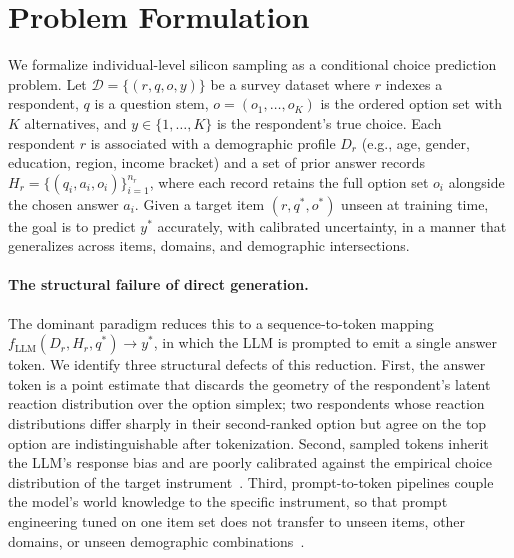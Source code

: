 \section{Problem Formulation}
\label{sec:problem}

We formalize individual-level silicon sampling as a conditional choice prediction problem. Let $\mathcal{D}=\{(r,q,o,y)\}$ be a survey dataset where $r$ indexes a respondent, $q$ is a question stem, $o=(o_1,\dots,o_K)$ is the ordered option set with $K$ alternatives, and $y\in\{1,\dots,K\}$ is the respondent's true choice. Each respondent $r$ is associated with a demographic profile $D_r$ (e.g., age, gender, education, region, income bracket) and a set of prior answer records $H_r=\{(q_i,a_i,o_i)\}_{i=1}^{n_r}$, where each record retains the full option set $o_i$ alongside the chosen answer $a_i$. Given a target item $(r,q^\ast,o^\ast)$ unseen at training time, the goal is to predict $y^\ast$ accurately, with calibrated uncertainty, in a manner that generalizes across items, domains, and demographic intersections.

\paragraph{The structural failure of direct generation.} The dominant paradigm reduces this to a sequence-to-token mapping $f_{\text{LLM}}(D_r,H_r,q^\ast)\to y^\ast$, in which the LLM is prompted to emit a single answer token. We identify three structural defects of this reduction. First, the answer token is a point estimate that discards the geometry of the respondent's latent reaction distribution over the option simplex; two respondents whose reaction distributions differ sharply in their second-ranked option but agree on the top option are indistinguishable after tokenization. Second, sampled tokens inherit the LLM's response bias and are poorly calibrated against the empirical choice distribution of the target instrument~\citep{geng2024survey}. Third, prompt-to-token pipelines couple the model's world knowledge to the specific instrument, so that prompt engineering tuned on one item set does not transfer to unseen items, other domains, or unseen demographic combinations~\citep{ku2026silicon}.


